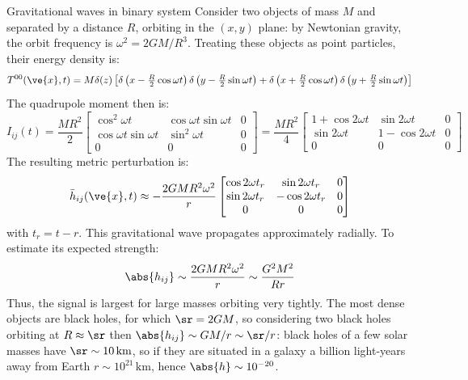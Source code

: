 \begin{example}{Gravitational waves in binary system}{}
  Consider two objects of mass $ M $ and separated by a distance $ R $, orbiting in the $ (x,y) $ plane: by Newtonian gravity, the orbit frequency is $ \omega^2 = 2GM / R^3 $. Treating these objects as point particles, their energy density is:
  \begin{equation*}
    T^{00}(\ve{x},t) = M \delta(z) \left[ \delta \left( x - \tfrac{R}{2} \cos \omega t \right) \delta \left( y - \tfrac{R}{2} \sin \omega t \right) + \delta \left( x + \tfrac{R}{2} \cos \omega t \right) \delta \left( y + \tfrac{R}{2} \sin \omega t \right) \right]
  \end{equation*}
  The quadrupole moment then is:
  \begin{equation*}
    I_{ij} (t) = \frac{MR^2}{2}
    \begin{bmatrix}
      \cos^2 \omega t & \cos \omega t \sin \omega t & 0 \\
      \cos \omega t \sin \omega t & \sin^2 \omega t & 0 \\
      0 & 0 & 0
    \end{bmatrix}
    = \frac{MR^2}{4}
    \begin{bmatrix}
      1 + \cos 2 \omega t & \sin 2 \omega t & 0 \\
      \sin 2 \omega t & 1 - \cos 2 \omega t & 0 \\
      0 & 0 & 0
    \end{bmatrix}
  \end{equation*}
  The resulting metric perturbation is:
  \begin{equation*}
    \bar{h}_{ij}(\ve{x},t) \approx - \frac{2GMR^2 \omega^2}{r}
    \begin{bmatrix}
      \cos 2 \omega t_r & \sin 2 \omega t_r & 0 \\
      \sin 2 \omega t_r & - \cos 2 \omega t_r & 0 \\
      0 & 0 & 0
    \end{bmatrix}
  \end{equation*}
  with $ t_r = t - r $. This gravitational wave propagates approximately radially. To estimate its expected strength:
  \begin{equation*}
    \abs{h_{ij}} \sim \frac{2GMR^2 \omega^2}{r} \sim \frac{G^2 M^2}{Rr}
  \end{equation*}
  Thus, the signal is largest for large masses orbiting very tightly. The most dense objects are black holes, for which $ \sr = 2GM $, so considering two black holes orbiting at $ R \approx \sr $ then $ \abs{h_{ij}} \sim GM / r \sim \sr / r $: black holes of a few solar masses have $ \sr \sim 10\,\text{km} $, so if they are situated in a galaxy a billion light-years away from Earth $ r \sim 10^{21}\,\text{km} $, hence $ \abs{h} \sim 10^{-20} $.
\end{example}

